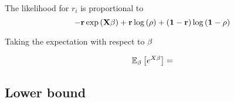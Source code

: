 \documentclass{amsart}
\begin{document}
The likelihood for $r_i$ is proportional to
$$
-\bf r \exp{\left(X\bf \beta\right)} + \bf r \log{(\rho)} + (1 - \bf r) \log{(1 - \rho)}
$$

Taking the expectation with respect to $\bf \beta$

$$
\mathbb{E_{\vbeta}}\left[ e^{X \vbeta} \right] = %
$$

\subsection{Lower bound}



\end{document}
